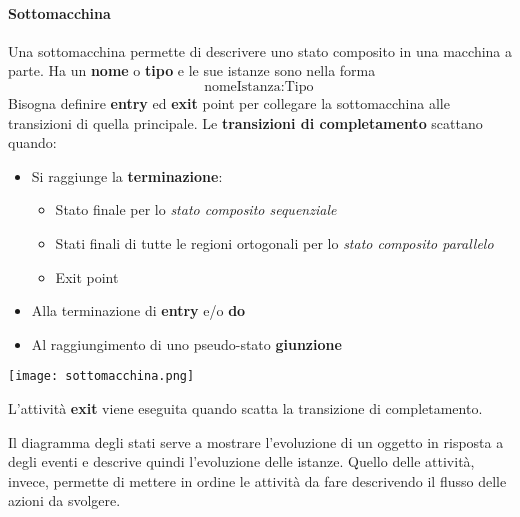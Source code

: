  \paragraph{Sottomacchina}
 Una sottomacchina permette di descrivere uno stato composito in una macchina a parte. Ha un \textbf{nome} o \textbf{tipo} e le sue istanze sono nella forma
 \begin{equation*}
 	\text{nomeIstanza}:\text{Tipo}
 \end{equation*}
 Bisogna definire \textbf{entry} ed \textbf{exit} point per collegare la sottomacchina alle transizioni di quella principale. Le \textbf{transizioni di completamento} scattano quando:
 \begin{itemize}
 	\item Si raggiunge la \textbf{terminazione}:
 	\begin{itemize}
 		\item Stato finale per lo \textit{stato composito sequenziale}
 		\item Stati finali di tutte le regioni ortogonali per lo \textit{stato composito parallelo}
 		\item Exit point
 	\end{itemize}
 	\item Alla terminazione di \textbf{entry} e/o \textbf{do}
 	\item Al raggiungimento di uno pseudo-stato \textbf{giunzione}
 \end{itemize}
 \begin{center}
 	\texttt{[image: sottomacchina.png]}
 \end{center}
 \begin{note}
 	L'attività \textbf{exit} viene eseguita quando scatta la transizione di completamento.
 \end{note}
 
 \begin{observation}
 	Il diagramma degli stati serve a mostrare l'evoluzione di un oggetto in risposta a degli eventi e descrive quindi l'evoluzione delle istanze. Quello delle attività, invece, permette di mettere in ordine le attività da fare descrivendo il flusso delle azioni da svolgere.
 \end{observation}